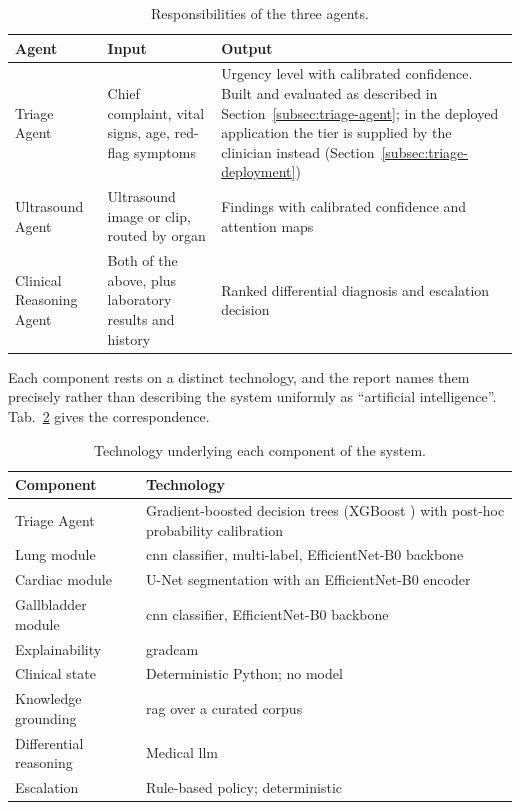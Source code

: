 \begin{table}[H]
  \centering
  \small
  \begin{tabularx}{\linewidth}{lXX}
    \toprule
    \textbf{Agent} & \textbf{Input} & \textbf{Output} \\
    \midrule
    Triage Agent & Chief complaint, vital signs, age, red-flag symptoms &
      Urgency level with calibrated confidence. Built and evaluated as described in
      Section~\ref{subsec:triage-agent}; in the deployed application the tier is supplied by
      the clinician instead (Section~\ref{subsec:triage-deployment}) \\
    \addlinespace[2pt]
    Ultrasound Agent & Ultrasound image or clip, routed by organ &
      Findings with calibrated confidence and attention maps \\
    \addlinespace[2pt]
    Clinical Reasoning Agent & Both of the above, plus laboratory results and history &
      Ranked differential diagnosis and escalation decision \\
    \bottomrule
  \end{tabularx}
  \caption{Responsibilities of the three agents.}
  \label{tab:agents}
\end{table}

Each component rests on a distinct technology, and the report names them precisely rather
than describing the system uniformly as ``artificial intelligence''. Tab.~\ref{tab:tech}
gives the correspondence.

\begin{table}[H]
  \centering
  \small
  \begin{tabularx}{\linewidth}{lX}
    \toprule
    \textbf{Component} & \textbf{Technology} \\
    \midrule
    Triage Agent            & Gradient-boosted decision trees (XGBoost
                              \cite{chen2016xgboost}) with post-hoc probability
                              calibration \\
    Lung module             & \gls{cnn} classifier, multi-label, EfficientNet-B0 backbone
                              \cite{tan2019efficientnet} \\
    Cardiac module          & U-Net segmentation \cite{ronneberger2015unet} with an
                              EfficientNet-B0 encoder \\
    Gallbladder module      & \gls{cnn} classifier, EfficientNet-B0 backbone \\
    Explainability          & \gls{gradcam} \cite{selvaraju2017gradcam} \\
    Clinical state          & Deterministic Python; no model \\
    Knowledge grounding     & \gls{rag} over a curated corpus \cite{lewis2020rag} \\
    Differential reasoning  & Medical \gls{llm} \cite{chen2024huatuogpto1} \\
    Escalation              & Rule-based policy; deterministic \\
    \bottomrule
  \end{tabularx}
  \caption{Technology underlying each component of the system.}
  \label{tab:tech}
\end{table}

